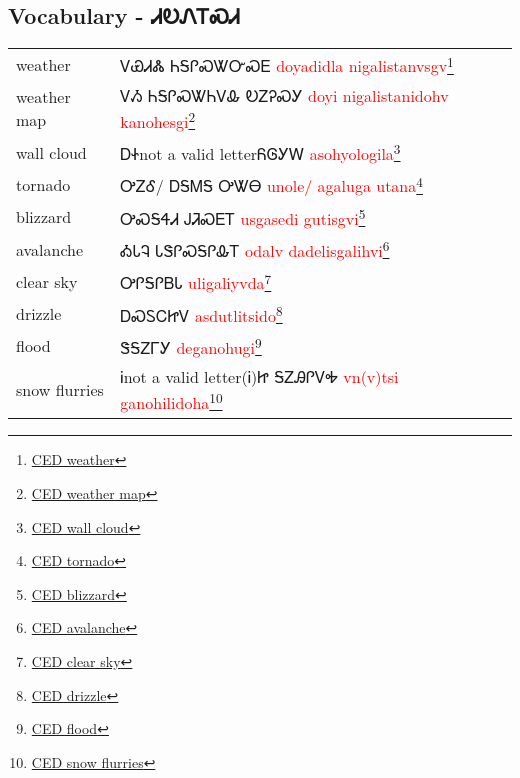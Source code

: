 \newpage\subsection{Vocabulary - ᏗᎧᏁᎢᏍᏗ 
}
\begin{minipage}{\linewidth}
\begin{tabular}{p{5cm} p{9cm}}
weather & ᏙᏯᏗᏜ ᏂᎦᎵᏍᏔᏅᏍᎬ 
 \newline \textcolor{red}{doyadidla nigalistanvsgv}\footnote{\href{https://cherokeedictionary.net/share/76306}{CED weather}}\\
weather map & ᏙᏱ ᏂᎦᎵᏍᏔᏂᏙᎲ ᎧᏃᎮᏍᎩ 
 \newline \textcolor{red}{doyi nigalistanidohv kanohesgi}\footnote{\href{https://cherokeedictionary.net/share/76304}{CED weather map}}\\
wall cloud & ᎠᏐnot a valid letterᏲᎶᎩᎳ 
 \newline \textcolor{red}{asohyologila}\footnote{\href{https://cherokeedictionary.net/share/101954}{CED wall cloud}}\\
tornado & ᎤᏃᎴ/ ᎠᎦᎷᎦ ᎤᏔᎾ 
 \newline \textcolor{red}{unole/ agaluga utana}\footnote{\href{https://cherokeedictionary.net/share/101955}{CED tornado}}\\
blizzard & ᎤᏍᎦᏎᏗ ᎫᏘᏍᎬᎢ 
 \newline \textcolor{red}{usgasedi gutisgvi}\footnote{\href{https://cherokeedictionary.net/share/101956}{CED blizzard}}\\
avalanche & ᎣᏓᎸ ᏓᏕᎵᏍᎦᎵᎲᎢ 
 \newline \textcolor{red}{odalv dadelisgalihvi}\footnote{\href{https://cherokeedictionary.net/share/101957}{CED avalanche}}\\
clear sky & ᎤᎵᎦᎵᏴᏓ 
 \newline \textcolor{red}{uligaliyvda}\footnote{\href{https://cherokeedictionary.net/share/101958}{CED clear sky}}\\
drizzle & ᎠᏍᏚᏟᏥᏙ 
 \newline \textcolor{red}{asdutlitsido}\footnote{\href{https://cherokeedictionary.net/share/101959}{CED drizzle}}\\
flood & ᏕᎦᏃᎱᎩ 
 \newline \textcolor{red}{deganohugi}\footnote{\href{https://cherokeedictionary.net/share/101960}{CED flood}}\\
snow flurries & Ꭵnot a valid letter(Ꭵ)Ꮵ  ᎦᏃᎯᎵᏙᎭ 
 \newline \textcolor{red}{vn(v)tsi  ganohilidoha}\footnote{\href{https://cherokeedictionary.net/share/101961}{CED snow flurries}}\\

\end{tabular}
\end{minipage}
